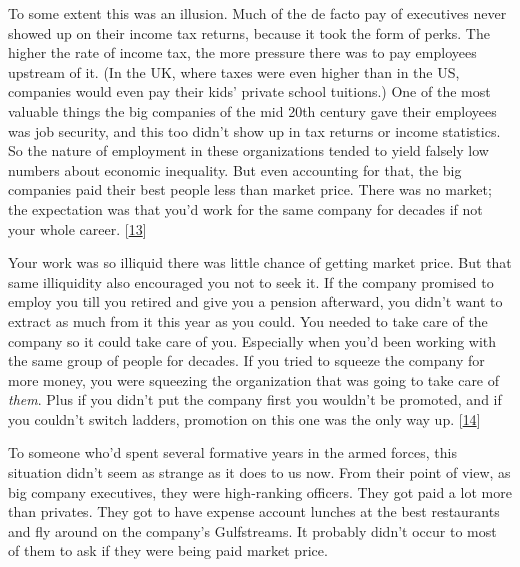 To some extent this was an illusion.  Much of the de facto pay of
executives never showed up on their income tax returns, because it
took the form of perks.  The higher the rate of income tax, the
more pressure there was to pay employees upstream of it.  (In the
UK, where taxes were even higher than in the US, companies would
even pay their kids' private school tuitions.)  One of the most
valuable things the big companies of the mid 20th century gave their
employees was job security, and this too didn't show up in tax
returns or income statistics. So the nature of employment in these
organizations tended to yield falsely low numbers about economic
inequality.  But even accounting for that, the big companies paid
their best people less than market price.  There was no market; the
expectation was that you'd work for the same company for decades
if not your whole career. 
[\href{\#f13n}{13}]

Your work was so illiquid there was little chance of getting market
price. But that same illiquidity also encouraged you not to seek
it.  If the company promised to employ you till you retired and
give you a pension afterward, you didn't want to extract as much
from it this year as you could. You needed to take care of the
company so it could take care of you.  Especially when you'd been
working with the same group of people for decades.  If you tried
to squeeze the company for more money, you were squeezing the
organization that was going to take care of \emph{them}.  Plus if
you didn't put the company first you wouldn't be promoted, and if
you couldn't switch ladders, promotion on this one was the only way
up. 
[\href{\#f14n}{14}]

To someone who'd spent several formative years in the armed forces,
this situation didn't seem as strange as it does to us now.  From
their point of view, as big company executives, they were high-ranking
officers.  They got paid a lot more than privates.  They got to
have expense account lunches at the best restaurants and fly around
on the company's Gulfstreams.  It probably didn't occur to most of
them to ask if they were being paid market price.

